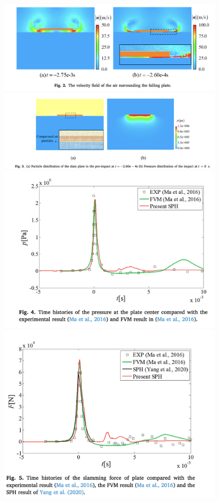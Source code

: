 \documentclass[UTF8]{ctexart}
\begin{document}
{
    \centering
    \includegraphics[width=30em]{./source/Fig2.png} \\
    \includegraphics[width=30em]{./source/Fig3.png} \\
    \includegraphics[width=30em]{./source/Fig4.png} \\
    \includegraphics[width=30em]{./source/Fig5.png} \\
}
\end{document}
